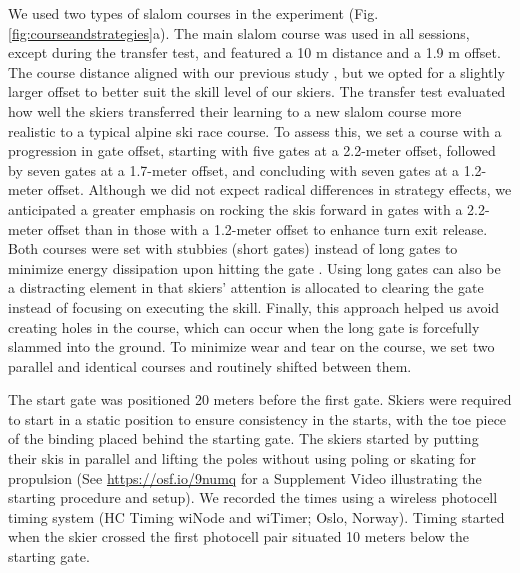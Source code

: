 \documentclass[pdflatex,sn-nature]{sn-jnl}%
\theoremstyle{thmstyleone}%
\theoremstyle{thmstyletwo}%
\theoremstyle{thmstylethree}%
\begin{document}
We used two types of slalom courses in the experiment (Fig. \ref{fig:courseandstrategies}a). The main slalom course was used in all sessions, except during the transfer test, and featured a 10 m distance and a 1.9 m offset. The course distance aligned with our previous study \cite{magelssen_is_2022}, but we opted for a slightly larger offset to better suit the skill level of our skiers. The transfer test evaluated how well the skiers transferred their learning to a new slalom course more realistic to a typical alpine ski race course. To assess this, we set a course with a progression in gate offset, starting with five gates at a 2.2-meter offset, followed by seven gates at a 1.7-meter offset, and concluding with seven gates at a 1.2-meter offset. Although we did not expect radical differences in strategy effects, we anticipated a greater emphasis on rocking the skis forward in gates with a 2.2-meter offset than in those with a 1.2-meter offset to enhance turn exit release. Both courses were set with stubbies (short gates) instead of long gates to minimize energy dissipation upon hitting the gate \cite{minetti_biomechanics_2018}. Using long gates can also be a distracting element in that skiers' attention is allocated to clearing the gate instead of focusing on executing the skill. Finally, this approach helped us avoid creating holes in the course, which can occur when the long gate is forcefully slammed into the ground. To minimize wear and tear on the course, we set two parallel and identical courses and routinely shifted between them.

The start gate was positioned 20 meters before the first gate. Skiers were required to start in a static position to ensure consistency in the starts, with the toe piece of the binding placed behind the starting gate. The skiers started by putting their skis in parallel and lifting the poles without using poling or skating for propulsion (See \href{https://osf.io/9numq}{https://osf.io/9numq} for a Supplement Video illustrating the starting procedure and setup). We recorded the times using a wireless photocell timing system (HC Timing wiNode and wiTimer; Oslo, Norway). Timing started when the skier crossed the first photocell pair situated 10 meters below the starting gate. 
 
\end{document}

